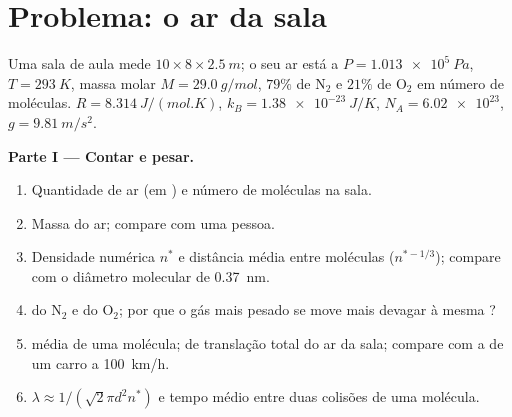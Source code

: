 \section{Problema: o ar da sala}

\begin{problem}
\label{pb:b1:kinetic-theory:1}
Uma sala de aula mede $10 \times 8 \times \qty{2.5}{m}$; o seu ar está a
$P = \qty{1.013e5}{Pa}$, $T = \qty{293}{K}$, massa molar $M = \qty{29.0}{g/mol}$,
$79\%$ de N$_2$ e $21\%$ de O$_2$ em número de moléculas. $R = \qty{8.314}{J/(mol.K)}$,
$k_B = \qty{1.38e-23}{J/K}$, $N_A = \num{6.02e23}$, $g = \qty{9.81}{m/s^2}$.

\medskip
\noindent\textbf{Parte I --- Contar e pesar.}
\begin{enumerate}
  \item Quantidade de ar (em ) e número de moléculas na sala.
  \item Massa do ar; compare com uma pessoa.
  \item Densidade numérica $n^*$ e distância média entre moléculas
        ($n^{*-1/3}$); compare com o diâmetro molecular de \qty{0.37}{nm}.
  \item {} do N$_2$ e do O$_2$; por que o gás mais
        pesado se move mais devagar à mesma ?
  \item {} média de uma molécula;  de
        translação total do ar da sala; compare com a  de
        um carro a \qty{100}{km/h}.
  \item {} $\lambda \approx 1/(\sqrt2\pi d^2n^*)$ e tempo
        médio entre duas colisões de uma molécula.
\end{enumerate}


\end{problem}
